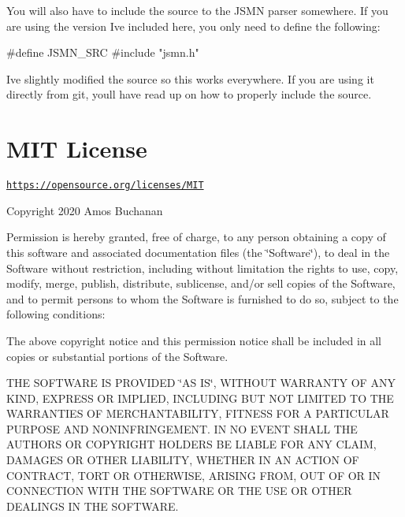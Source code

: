 You will also have to include the source to the J\+S\+MN parser somewhere. If you are using the version I\textquotesingle{}ve included here, you only need to define the following\+:


\begin{DoxyCode}
\textcolor{preprocessor}{#define JSMN\_SRC}
\textcolor{preprocessor}{#include "jsmn.h"}
\end{DoxyCode}


I\textquotesingle{}ve slightly modified the source so this works everywhere. If you are using it directly from git, you\textquotesingle{}ll have read up on how to properly include the source.\hypertarget{index_autotoc_md16}{}\section{M\+I\+T License}\label{index_autotoc_md16}
\href{https://opensource.org/licenses/MIT}{\tt https\+://opensource.\+org/licenses/\+M\+IT}

Copyright 2020 Amos Buchanan

Permission is hereby granted, free of charge, to any person obtaining a copy of this software and associated documentation files (the \char`\"{}\+Software\char`\"{}), to deal in the Software without restriction, including without limitation the rights to use, copy, modify, merge, publish, distribute, sublicense, and/or sell copies of the Software, and to permit persons to whom the Software is furnished to do so, subject to the following conditions\+:

The above copyright notice and this permission notice shall be included in all copies or substantial portions of the Software.

T\+HE S\+O\+F\+T\+W\+A\+RE IS P\+R\+O\+V\+I\+D\+ED \char`\"{}\+A\+S I\+S\char`\"{}, W\+I\+T\+H\+O\+UT W\+A\+R\+R\+A\+N\+TY OF A\+NY K\+I\+ND, E\+X\+P\+R\+E\+SS OR I\+M\+P\+L\+I\+ED, I\+N\+C\+L\+U\+D\+I\+NG B\+UT N\+OT L\+I\+M\+I\+T\+ED TO T\+HE W\+A\+R\+R\+A\+N\+T\+I\+ES OF M\+E\+R\+C\+H\+A\+N\+T\+A\+B\+I\+L\+I\+TY, F\+I\+T\+N\+E\+SS F\+OR A P\+A\+R\+T\+I\+C\+U\+L\+AR P\+U\+R\+P\+O\+SE A\+ND N\+O\+N\+I\+N\+F\+R\+I\+N\+G\+E\+M\+E\+NT. IN NO E\+V\+E\+NT S\+H\+A\+LL T\+HE A\+U\+T\+H\+O\+RS OR C\+O\+P\+Y\+R\+I\+G\+HT H\+O\+L\+D\+E\+RS BE L\+I\+A\+B\+LE F\+OR A\+NY C\+L\+A\+IM, D\+A\+M\+A\+G\+ES OR O\+T\+H\+ER L\+I\+A\+B\+I\+L\+I\+TY, W\+H\+E\+T\+H\+ER IN AN A\+C\+T\+I\+ON OF C\+O\+N\+T\+R\+A\+CT, T\+O\+RT OR O\+T\+H\+E\+R\+W\+I\+SE, A\+R\+I\+S\+I\+NG F\+R\+OM, O\+UT OF OR IN C\+O\+N\+N\+E\+C\+T\+I\+ON W\+I\+TH T\+HE S\+O\+F\+T\+W\+A\+RE OR T\+HE U\+SE OR O\+T\+H\+ER D\+E\+A\+L\+I\+N\+GS IN T\+HE S\+O\+F\+T\+W\+A\+RE. 